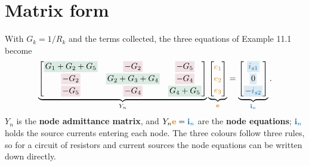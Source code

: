\documentclass[11pt,a4paper]{article}
\newcommand{\Icol}[1]{\textcolor{ccur}{#1}}
\newcommand{\Vcol}[1]{\textcolor{cvolt}{#1}}
\newcommand{\cbx}[2]{{\setlength{\fboxsep}{1.6pt}\colorbox{#1}{$\displaystyle #2\mathstrut$}}}
\newcommand{\dg}[1]{\cbx{cpow!16}{#1}}
\newcommand{\od}[1]{\cbx{metured!13}{#1}}
\newcommand{\e}[1]{\textcolor{cvolt}{e_{#1}}}
\begin{document}
\section{Matrix form}

With $G_k = 1/R_k$ and the terms collected, the three equations of Example 11.1 become
\[
  \underbrace{\begin{bmatrix}
    \dg{G_1 + G_2 + G_5} & \od{-G_2} & \od{-G_5}\\[2pt]
    \od{-G_2} & \dg{G_2 + G_3 + G_4} & \od{-G_4}\\[2pt]
    \od{-G_5} & \od{-G_4} & \dg{G_4 + G_5}
  \end{bmatrix}}_{Y_n}
  \underbrace{\begin{bmatrix} \e{1}\\[2pt] \e{2}\\[2pt] \e{3} \end{bmatrix}}_{\Vcol{\mathbf{e}}}
  =
  \underbrace{\begin{bmatrix} \cbx{ccur!14}{\Icol{i_{s1}}}\\[2pt] \cbx{ccur!14}{0}\\[2pt] \cbx{ccur!14}{-\Icol{i_{s2}}} \end{bmatrix}}_{\Icol{\mathbf{i}_n}} .
\]
$Y_n$ is the \textbf{node admittance matrix}, and $Y_n\Vcol{\mathbf{e}} = \Icol{\mathbf{i}_n}$
are the \textbf{node equations}; $\Icol{\mathbf{i}_n}$ holds the source currents entering each
node. The three colours follow three rules, so for a circuit of resistors and current sources
the node equations can be written down directly.
\end{document}
